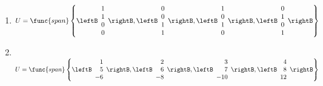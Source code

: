 \begin{multicols}{2}
\begin{ex}
\begin{enumerate}[label={\alph*.}]
\item
$U = \func{span}
\left\{
\leftB \begin{array}{r}
1\\
1\\
0\\
0
\end{array} \rightB, \leftB \begin{array}{r}
0\\
0\\
1\\
1
\end{array} \rightB, \leftB \begin{array}{r}
1\\
0\\
1\\
0
\end{array} \rightB, \leftB \begin{array}{r}
0\\
1\\
0\\
1
\end{array} \rightB
\right\}$

\item \hspace{1em} \\
\hspace*{-2.5em}$
U = \func{span}
\left\{
\leftB \begin{array}{r}
1\\
5\\
-6
\end{array} \rightB, \leftB \begin{array}{r}
2\\
6\\
-8
\end{array} \rightB, \leftB \begin{array}{r}
3\\
7\\
-10
\end{array} \rightB, \leftB \begin{array}{r}
4\\
8\\
12
\end{array} \rightB
\right\}$


\end{enumerate}
\end{ex}
\end{multicols}
